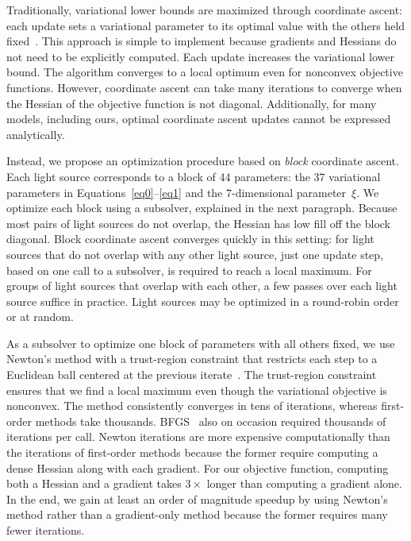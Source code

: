 Traditionally, variational lower bounds are maximized through coordinate ascent: each update sets a variational parameter to its optimal value with the others held fixed~\citep{bishop2006pattern,murphy2012machine}. This approach is simple to implement because gradients and Hessians do not need to be explicitly computed. Each update increases the variational lower bound. The algorithm converges to a local optimum even for nonconvex objective functions.
However, coordinate ascent can take many iterations to converge when the Hessian of the objective function is not diagonal.
Additionally, for many models, including ours, optimal coordinate ascent updates cannot be expressed analytically.

Instead, we propose an optimization procedure based on \textit{block} coordinate ascent. Each light source corresponds to a block of 44 parameters: the 37 variational parameters in Equations~\ref{eq0}--\ref{eq1} and the $7$-dimensional parameter~$\xi$. We optimize each block using a subsolver, explained in the next paragraph. Because most pairs of light sources do not overlap, the Hessian has low fill off the block diagonal.
Block coordinate ascent converges quickly in this setting: for light sources that do not overlap with any other light source, just one update step, based on one call to a subsolver, is required to reach a local maximum. For groups of light sources that overlap with each other, a few passes over each light source suffice in practice. Light sources may be optimized in a round-robin order or at random.

As a subsolver to optimize one block of parameters with all others fixed, we use Newton's method with a trust-region constraint that restricts each step to a Euclidean ball centered at the previous iterate~\citep{nocedal2006numerical}.
The trust-region constraint ensures that we find a local maximum even though the variational objective is nonconvex.
The method consistently converges in tens of iterations, whereas first-order methods take thousands. BFGS~\citep{nocedal2006numerical} also on occasion required thousands of iterations per call. Newton iterations are more expensive computationally than the iterations of first-order methods  because the former require computing a dense Hessian along with each gradient.
For our objective function, computing both a Hessian and a gradient takes $3\times$ longer than computing a gradient alone. In the end, we gain at least an order of magnitude speedup by using Newton's method rather than a gradient-only method because the former requires many fewer iterations.


